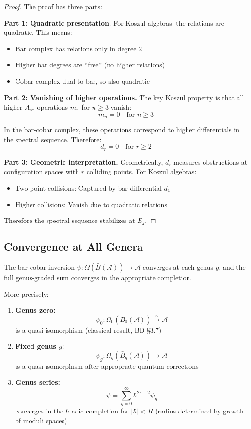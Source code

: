 \begin{proof}
The proof has three parts:

\textbf{Part 1: Quadratic presentation.}
For Koszul algebras, the relations are quadratic. This means:
\begin{itemize}
\item Bar complex has relations only in degree 2
\item Higher bar degrees are ``free'' (no higher relations)
\item Cobar complex dual to bar, so also quadratic
\end{itemize}

\textbf{Part 2: Vanishing of higher operations.}
The key Koszul property is that all higher $A_\infty$ operations $m_n$ for $n \geq 3$ 
vanish:
$$m_n = 0 \quad \text{for } n \geq 3$$

In the bar-cobar complex, these operations correspond to higher differentials in 
the spectral sequence. Therefore:
$$d_r = 0 \quad \text{for } r \geq 2$$

\textbf{Part 3: Geometric interpretation.}
Geometrically, $d_r$ measures obstructions at configuration spaces with $r$ colliding 
points. For Koszul algebras:
\begin{itemize}
\item Two-point collisions: Captured by bar differential $d_1$
\item Higher collisions: Vanish due to quadratic relations
\end{itemize}

Therefore the spectral sequence stabilizes at $E_2$.
\end{proof}

\subsection{Convergence at All Genera}

\begin{theorem}\label{thm:genus-graded-convergence}
The bar-cobar inversion $\psi: \Omega(\bar{B}(\mathcal{A})) \to \mathcal{A}$ 
converges at each genus $g$, and the full genus-graded sum converges in the 
appropriate completion.

More precisely:
\begin{enumerate}
\item \textbf{Genus zero:} 
      $$\psi_0: \Omega_0(\bar{B}_0(\mathcal{A})) \xrightarrow{\sim} \mathcal{A}$$
      is a quasi-isomorphism (classical result, BD §3.7)
      
\item \textbf{Fixed genus $g$:}
      $$\psi_g: \Omega_g(\bar{B}_g(\mathcal{A})) \to \mathcal{A}$$
      is a quasi-isomorphism after appropriate quantum corrections
      
\item \textbf{Genus series:}
      $$\psi = \sum_{g=0}^\infty \hbar^{2g-2} \psi_g$$
      converges in the $\hbar$-adic completion for $|\hbar| < R$ (radius determined 
      by growth of moduli spaces)
\end{enumerate}
\end{theorem}

